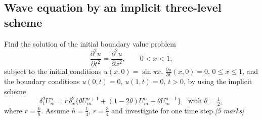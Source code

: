 \documentclass[11pt,a4paper]{article}
\newcommand{\mk}[1]{\hfill\textit{[#1 marks]}}
\newcommand{\pd}[2]{\frac{\partial #1}{\partial #2}}
\newcommand{\pdd}[2]{\frac{\partial^2 #1}{\partial #2^2}}
\begin{document}
\subsection{Wave equation by an implicit three-level scheme}

\begin{qbox}
Find the solution of the initial boundary value problem
\[
  \pdd ut=\pdd ux,\qquad 0<x<1,
\]
subject to the initial conditions \(u(x,0)=\sin\pi x\),
\(\pd ut(x,0)=0\), \(0\le x\le1\), and the boundary conditions
\(u(0,t)=0\), \(u(1,t)=0\), \(t>0\), by using the implicit scheme
\[
  \delta_t^2U_m^n=r\,\delta_x^2\bigl\{\theta U_m^{n+1}+(1-2\theta)U_m^n
  +\theta U_m^{n-1}\bigr\}\quad\text{with }\theta=\tfrac12,
\]
where \(r=\frac kh\).  Assume \(h=\frac14\), \(r=\frac34\) and
investigate for one time step.\mk{5}
\end{qbox}
\end{document}
